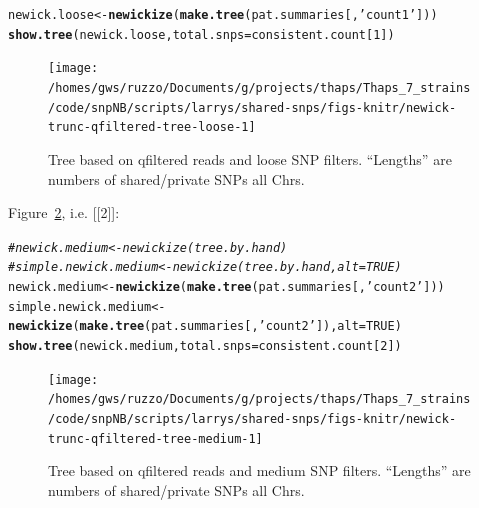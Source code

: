 \documentclass{article}\usepackage[]{graphicx}\usepackage[]{color}
\makeatletter
\newcommand{\hlnum}[1]{\textcolor[rgb]{0.686,0.059,0.569}{#1}}%
\newcommand{\hlstr}[1]{\textcolor[rgb]{0.192,0.494,0.8}{#1}}%
\newcommand{\hlcom}[1]{\textcolor[rgb]{0.678,0.584,0.686}{\textit{#1}}}%
\newcommand{\hlstd}[1]{\textcolor[rgb]{0.345,0.345,0.345}{#1}}%
\newcommand{\hlkwb}[1]{\textcolor[rgb]{0.69,0.353,0.396}{#1}}%
\newcommand{\hlkwc}[1]{\textcolor[rgb]{0.333,0.667,0.333}{#1}}%
\newcommand{\hlkwd}[1]{\textcolor[rgb]{0.737,0.353,0.396}{\textbf{#1}}}%
\newenvironment{kframe}{%
 \def\at@end@of@kframe{}%
 \ifinner\ifhmode%
  \def\at@end@of@kframe{\end{minipage}}%
  \begin{minipage}{\columnwidth}%
 \fi\fi%
 \def\FrameCommand##1{\hskip\@totalleftmargin \hskip-\fboxsep
 \colorbox{shadecolor}{##1}\hskip-\fboxsep
     \hskip-\linewidth \hskip-\@totalleftmargin \hskip\columnwidth}%
 \MakeFramed {\advance\hsize-\width
   \@totalleftmargin\z@ \linewidth\hsize
   \@setminipage}}%
 {\par\unskip\endMakeFramed%
 \at@end@of@kframe}
\newenvironment{knitrout}{}{} %
\makeatother
\begin{document}
\begin{knitrout}\scriptsize
{}\color{fgcolor}\begin{kframe}
\begin{alltt}
\hlstd{newick.loose} \hlkwb{<-} \hlkwd{newickize}\hlstd{(}\hlkwd{make.tree}\hlstd{(pat.summaries[,}\hlstr{'count1'}\hlstd{]))}
\hlkwd{show.tree}\hlstd{(newick.loose,} \hlkwc{total.snps}\hlstd{=consistent.count[}\hlnum{1}\hlstd{])}
\end{alltt}
\end{kframe}\begin{figure}

{\centering \texttt{[image: /homes/gws/ruzzo/Documents/g/projects/thaps/Thaps\_7\_strains/code/snpNB/scripts/larrys/shared-snps/figs-knitr/newick-trunc-qfiltered-tree-loose-1]} 

}

\caption[Tree based on qfiltered reads and loose SNP filters]{Tree based on qfiltered reads and loose SNP filters.  ``Lengths'' are numbers of shared/private SNPs all Chrs.}\label{fig:tree-loose}
\end{figure}


\end{knitrout}

Figure~\ref{fig:tree-medium}, i.e. [[2]]:

\begin{knitrout}\scriptsize
{}\color{fgcolor}\begin{kframe}
\begin{alltt}
\hlcom{# newick.medium <- newickize(tree.by.hand)}
\hlcom{# simple.newick.medium <- newickize(tree.by.hand,alt=TRUE)}
\hlstd{newick.medium} \hlkwb{<-} \hlkwd{newickize}\hlstd{(}\hlkwd{make.tree}\hlstd{(pat.summaries[,}\hlstr{'count2'}\hlstd{]))}
\hlstd{simple.newick.medium} \hlkwb{<-} \hlkwd{newickize}\hlstd{(}\hlkwd{make.tree}\hlstd{(pat.summaries[,}\hlstr{'count2'}\hlstd{]),}\hlkwc{alt}\hlstd{=}\hlnum{TRUE}\hlstd{)}
\hlkwd{show.tree}\hlstd{(newick.medium,} \hlkwc{total.snps}\hlstd{=consistent.count[}\hlnum{2}\hlstd{])}
\end{alltt}
\end{kframe}\begin{figure}

{\centering \texttt{[image: /homes/gws/ruzzo/Documents/g/projects/thaps/Thaps\_7\_strains/code/snpNB/scripts/larrys/shared-snps/figs-knitr/newick-trunc-qfiltered-tree-medium-1]} 

}

\caption[Tree based on qfiltered reads and medium SNP filters]{Tree based on qfiltered reads and medium SNP filters.  ``Lengths'' are numbers of shared/private SNPs all Chrs.}\label{fig:tree-medium}
\end{figure}


\end{knitrout}
\end{document}
